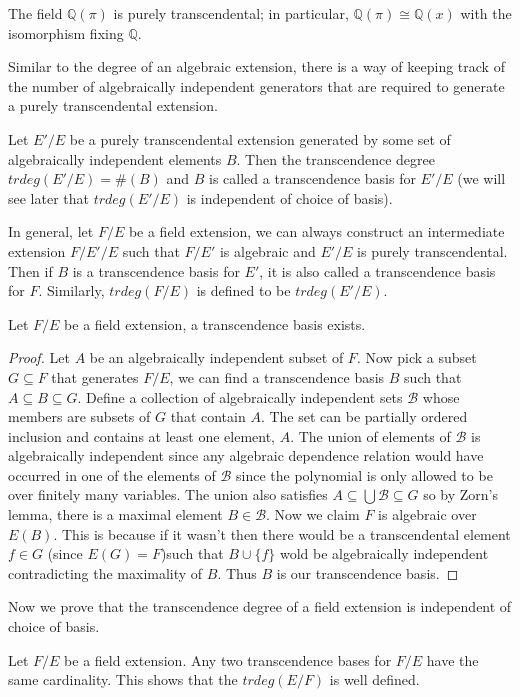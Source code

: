 \begin{example} The field $\mathbb{Q}(\pi)$ is purely transcendental; in
particular, $\mathbb{Q}(\pi)\cong\mathbb{Q}(x)$ with the isomorphism fixing
$\mathbb{Q}$. \end{example}
Similar to the degree of an algebraic extension, there is a way of keeping
track of the number of algebraically independent generators that are required to
generate a purely transcendental extension.
\begin{definition} Let $E'/E$ be a purely transcendental extension generated by
some set of algebraically independent elements $B$. Then the transcendence
degree $trdeg(E'/E)=\#(B)$ and $B$ is called a transcendence basis for $E'/E$
(we will see later that $trdeg(E'/E)$ is independent of choice of basis).
\end{definition}
In general, let $F/E$ be a field extension, we can always construct an
intermediate extension $F/E'/E$ such that $F/E'$ is algebraic and $E'/E$ is
purely transcendental. Then if $B$ is a transcendence basis for $E'$, it is
also called a transcendence basis for $F$. Similarly, $trdeg(F/E)$ is defined to
be
$trdeg(E'/E)$.
\begin{theorem} Let $F/E$ be a field extension, a transcendence basis exists.
\end{theorem}
\begin{proof} Let $A$ be an algebraically independent subset of $F$. Now pick a
subset $G\subseteq F$ that generates $F/E$, we can find a transcendence basis
$B$ such that $A\subseteq B\subseteq G$. Define a collection of algebraically
independent sets $\mathcal{B}$ whose members are subsets of $G$ that contain
$A$. The set can be partially ordered inclusion and contains at least one
element, $A$. The union of elements of $\mathcal{B}$ is algebraically
independent since any algebraic dependence relation would have occurred in one
of the elements of $\mathcal{B}$ since the polynomial is only allowed to be over
finitely many variables. The union also satisfies $A\subseteq
\bigcup\mathcal{B}\subseteq G$ so by Zorn's lemma, there is a maximal element
$B\in\mathcal{B}$. Now we claim $F$ is algebraic over $E(B)$. This is because
if it wasn't then there would be a transcendental element $f\in G$ (since
$E(G)=F$)such that $B\cup\{f\}$ wold be algebraically independent contradicting
the
maximality of $B$. Thus $B$ is our transcendence basis. \end{proof}
Now we prove that the transcendence degree of a field extension is independent
of choice of basis.
\begin{theorem} Let $F/E$ be a field extension. Any two transcendence bases for
$F/E$ have the same cardinality. This shows that the $trdeg(E/F)$ is well
defined. \end{theorem}
